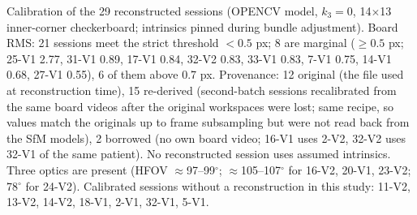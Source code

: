 Calibration of the 29 reconstructed sessions (OPENCV model, $k_3=0$, 14$\times$13 inner-corner checkerboard; intrinsics pinned during bundle adjustment). Board RMS: 21 sessions meet the strict threshold $<0.5$ px; 8 are marginal ($\geq0.5$ px; 25-V1 2.77, 31-V1 0.89, 17-V1 0.84, 32-V2 0.83, 33-V1 0.83, 7-V1 0.75, 14-V1 0.68, 27-V1 0.55), 6 of them above 0.7 px. Provenance: 12 original (the file used at reconstruction time), 15 re-derived (second-batch sessions recalibrated from the same board videos after the original workspaces were lost; same recipe, so values match the originals up to frame subsampling but were not read back from the SfM models), 2 borrowed (no own board video; 16-V1 uses 2-V2, 32-V2 uses 32-V1 of the same patient). No reconstructed session uses assumed intrinsics. Three optics are present (HFOV $\approx$97--99$^\circ$; $\approx$105--107$^\circ$ for 16-V2, 20-V1, 23-V2; 78$^\circ$ for 24-V2). Calibrated sessions without a reconstruction in this study: 11-V2, 13-V2, 14-V2, 18-V1, 2-V1, 32-V1, 5-V1.
